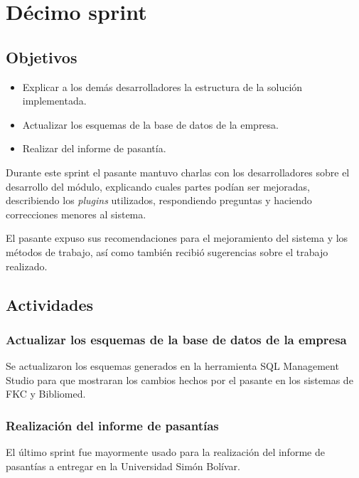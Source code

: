 ﻿\section{Décimo sprint} %
\label{sec:decimo_sprint}

\subsection{Objetivos}

\begin{itemize}
	\item Explicar a los demás desarrolladores la estructura de la solución implementada.
	\item Actualizar los esquemas de la base de datos de la empresa.
	\item Realizar del informe de pasantía.
\end{itemize}

Durante este sprint el pasante mantuvo charlas con los desarrolladores sobre el desarrollo del módulo, explicando cuales partes podían ser mejoradas, describiendo los \emph{plugins} utilizados, respondiendo preguntas y haciendo correcciones menores al sistema. 

El pasante expuso sus recomendaciones para el mejoramiento del sistema y los métodos de trabajo, así como también recibió sugerencias sobre el trabajo realizado.

\subsection{Actividades} %
\label{sub:actividades10}

\subsubsection{Actualizar los esquemas de la base de datos de la empresa}

Se actualizaron los esquemas generados en la herramienta SQL Management Studio para que mostraran los cambios hechos por el pasante en los sistemas de FKC y Bibliomed.

\subsubsection{Realización del informe de pasantías}

El último sprint fue mayormente usado para la realización del informe de pasantías a entregar en la Universidad Simón Bolívar.


